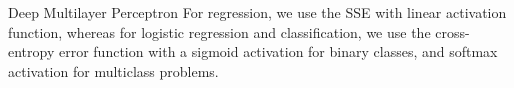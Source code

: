 \begin{frame}{Deep Multilayer Perceptron}
%
For regression, we use the SSE with
linear activation function, whereas for 
logistic regression and classification, we use the cross-entropy error
function with a sigmoid activation for binary classes, and softmax
activation for multiclass problems. %
\end{frame}
%
